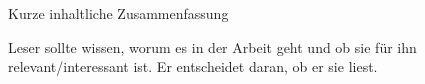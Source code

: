
Kurze inhaltliche Zusammenfassung

Leser sollte wissen, worum es in der Arbeit geht und ob sie für ihn relevant/interessant ist. Er entscheidet daran, ob er sie liest.

